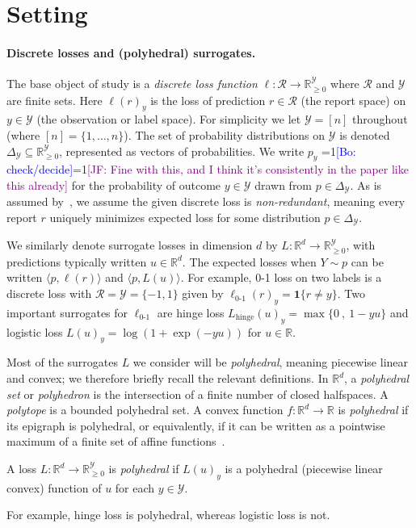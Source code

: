\documentclass[anon]{colt2020} %
\newcommand{\Comments}{1}
\newcommand{\mynote}[2]{\ifnum\Comments=1\textcolor{#1}{#2}\fi}
\newcommand{\jessie}[1]{\mynote{purple}{[JF: #1]}}
\newcommand{\bo}[1]{\mynote{blue}{[Bo: #1]}}
\newcommand{\reals}{\mathbb{R}}
\newcommand{\nonnegreals}{\reals_{\geq 0}}%
\newcommand{\simplex}{\Delta_\Y}
\newcommand{\R}{\mathcal{R}}
\newcommand{\Y}{\mathcal{Y}}
\newcommand{\hinge}{L_{\mathrm{hinge}}}
\newcommand{\ellzo}{\ell_{\text{0-1}}}
\newcommand{\inprod}[2]{\langle #1, #2 \rangle}%
\newcommand{\Ind}[1]{\mathbf{1}\{#1\}}
\begin{document}
\section{Setting}

\paragraph{Discrete losses and (polyhedral) surrogates.}

The base object of study is a \emph{discrete loss function} $\ell: \R \to \nonnegreals^{\Y}$ where $\R$ and $\Y$ are finite sets.
Here $\ell(r)_y$ is the loss of prediction $r \in \R$ (the report space) on $y \in \Y$ (the observation or label space).
For simplicity we let $\Y = [n]$ throughout (where $[n] = \{1,\ldots,n\}$).
The set of probability distributions on $\Y$ is denoted $\simplex\subseteq\nonnegreals^{\Y}$, represented as vectors of probabilities.
We write $p_y$ \bo{check/decide}\jessie{Fine with this, and I think it's consistently in the paper like this already} for the probability of outcome $y \in \Y$ drawn from $p \in \simplex$.
As is assumed by~\cite{finocchiaro2019embedding}, we assume the given discrete loss is \emph{non-redundant}, meaning every report $r$ uniquely minimizes expected loss for some distribution $p\in\simplex$.

We similarly denote surrogate losses in dimension $d$ by $L:\reals^d\to\nonnegreals^{\Y}$, with predictions typically written $u\in\reals^d$.
The expected losses when $Y \sim p$ can be written $\inprod{p}{\ell(r)}$ and $\inprod{p}{L(u)}$.
For example, 0-1 loss on two labels is a discrete loss with $\R = \Y = \{-1,1\}$
given by $\ellzo(r)_y = \Ind{r \neq y}$.
Two important surrogates for $\ellzo$ are hinge loss $\hinge(u)_y = \max\{ 0 ~,~ 1-yu \}$ and logistic loss $L(u)_y = \log(1+\exp(-yu))$ for $u\in\reals$.

Most of the surrogates $L$ we consider will be \emph{polyhedral}, meaning piecewise linear and convex; we therefore briefly recall the relevant definitions.
In $\reals^d$, a \emph{polyhedral set} or \emph{polyhedron} is the intersection of a finite number of closed halfspaces.
A \emph{polytope} is a bounded polyhedral set.
A convex function $f:\reals^d\to\reals$ is \emph{polyhedral} if its epigraph is polyhedral, or equivalently, if it can be written as a pointwise maximum of a finite set of affine functions~\citep{rockafellar1997convex}.
%
\begin{definition}
	A loss $L: \reals^d \to \nonnegreals^{\Y}$ is \emph{polyhedral} if $L(u)_y$ is a polyhedral (piecewise linear convex) function of $u$ for each $y\in\Y$.
\end{definition}
%
For example, hinge loss is polyhedral, whereas logistic loss is not.
\end{document}

